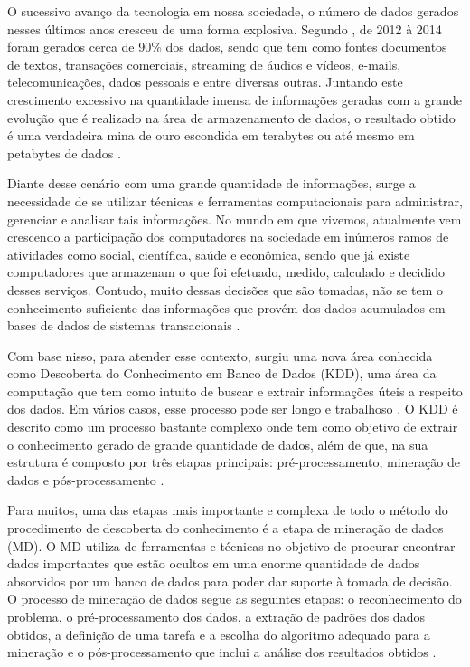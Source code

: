 
\par
O sucessivo avanço da tecnologia em nossa sociedade, o número de dados gerados nesses últimos anos cresceu de uma forma explosiva. Segundo , de 2012 à 2014 foram gerados cerca de 90\% dos dados, sendo que tem como fontes documentos de textos, transações comerciais, streaming de áudios e vídeos, e-mails, telecomunicações, dados pessoais e entre diversas outras. Juntando este crescimento excessivo na quantidade imensa de informações geradas com a grande evolução que é realizado na área de armazenamento de dados, o resultado obtido é uma verdadeira mina de ouro escondida em terabytes ou até mesmo em petabytes de dados \cite{Carvalho2014}. 

\par
Diante desse cenário com uma grande quantidade de informações, surge a necessidade de se utilizar técnicas e ferramentas computacionais para administrar, gerenciar e analisar tais informações. No mundo em que vivemos, atualmente vem crescendo a participação dos computadores na sociedade em inúmeros ramos de atividades como social, científica, saúde e econômica, sendo que já existe computadores que armazenam o que foi efetuado, medido, calculado e decidido desses serviços. Contudo, muito dessas decisões que são tomadas, não se tem o conhecimento suficiente das informações que provém dos dados acumulados em bases de dados de sistemas transacionais \cite{Rabelo2007}.

\par
Com base nisso, para atender esse contexto, surgiu uma nova área conhecida como Descoberta do Conhecimento em Banco de Dados (KDD), uma área da computação que tem como intuito de buscar e extrair informações úteis a respeito dos dados. Em vários casos, esse processo pode ser longo e trabalhoso \cite{Stulp2014}. O KDD é descrito como um processo bastante complexo onde tem como objetivo de extrair o conhecimento gerado de grande quantidade de dados, além de que, na sua estrutura é composto por três etapas principais: pré-processamento, mineração de dados e pós-processamento \cite{Rabelo2007}.

\par
Para muitos, uma das etapas mais importante e complexa de todo o método do procedimento de descoberta do conhecimento é a etapa de mineração de dados (MD). O MD utiliza de ferramentas e técnicas no objetivo de procurar encontrar dados importantes que estão ocultos em uma enorme quantidade de dados absorvidos por um banco de dados para poder dar suporte à tomada de decisão. O processo de mineração de dados segue as seguintes etapas: o reconhecimento do problema, o pré-processamento dos dados, a extração de padrões dos dados obtidos, a definição de uma tarefa e a escolha do algoritmo adequado para a mineração e o pós-processamento que inclui a análise dos resultados obtidos \cite{Stulp2014}. 

